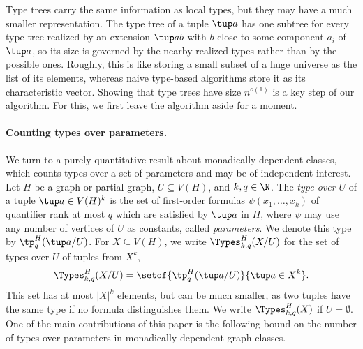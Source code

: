 \begin{center}
\begin{tikzpicture}
  \end{tikzpicture}
  \label{fig:ov-type-tree}
\end{center}

Type trees carry the same information as local types, but they may have a much smaller representation.
The type tree of a tuple $\tup a$ has one subtree for every type tree realized by an extension $\tup a b$ with $b$ close to some component $a_i$ of $\tup a$, so its size is governed by the nearby realized types rather than by the possible ones.
Roughly, this is like storing a small subset of a huge universe as the list of its elements, whereas naive type-based algorithms store it as its characteristic vector.
Showing that type trees have size $n^{o(1)}$ is a key step of our algorithm.
For this, we first leave the algorithm aside for a moment.

\paragraph{Counting types over parameters.}
We turn to a purely quantitative result about monadically dependent classes, which counts types over a set of parameters and may be of independent interest.
Let $H$ be a graph or partial graph, $U\subseteq V(H)$, and $k,q\in\N$.
The \emph{type over $U$} of a tuple $\tup a\in V(H)^k$ is the set of first-order formulas $\psi(x_1,\ldots,x_k)$ of quantifier rank at most $q$ which are satisfied by $\tup a$ in $H$,
where $\psi$ may use any number of vertices of $U$ as constants, called \emph{parameters}. We denote this type by $\tp^H_q(\tup a/U)$.
For $X\subseteq V(H)$, we write $\Types^H_{k,q}(X/U)$ for the set of types over $U$ of tuples from $X^k$,
$$\Types^H_{k,q}(X/U)=\setof{\tp^H_q(\tup a/U)}{\tup a\in X^k}.$$
This set has at most $|X|^k$ elements, but can be much smaller, as two tuples  have the same type if no formula distinguishes them.
We write $\Types^H_{k,q}(X)$ if $U=\emptyset$.
One of the main contributions of this paper is the following bound on the number of types over parameters in monadically dependent graph classes.

